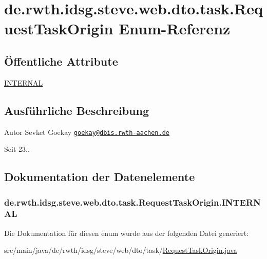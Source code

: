 \hypertarget{enumde_1_1rwth_1_1idsg_1_1steve_1_1web_1_1dto_1_1task_1_1_request_task_origin}{\section{de.\+rwth.\+idsg.\+steve.\+web.\+dto.\+task.\+Request\+Task\+Origin Enum-\/\+Referenz}
\label{enumde_1_1rwth_1_1idsg_1_1steve_1_1web_1_1dto_1_1task_1_1_request_task_origin}
}
\subsection*{Öffentliche Attribute}
\begin{DoxyCompactItemize}
\item 
\hyperlink{enumde_1_1rwth_1_1idsg_1_1steve_1_1web_1_1dto_1_1task_1_1_request_task_origin_a9d491dee4bc48d5484f074c4d2730bfe}{I\+N\+T\+E\+R\+N\+A\+L}
\end{DoxyCompactItemize}


\subsection{Ausführliche Beschreibung}
\begin{DoxyAuthor}{Autor}
Sevket Goekay \href{mailto:goekay@dbis.rwth-aachen.de}{\tt goekay@dbis.\+rwth-\/aachen.\+de} 
\end{DoxyAuthor}
\begin{DoxySince}{Seit}
23.. 
\end{DoxySince}


\subsection{Dokumentation der Datenelemente}
\hypertarget{enumde_1_1rwth_1_1idsg_1_1steve_1_1web_1_1dto_1_1task_1_1_request_task_origin_a9d491dee4bc48d5484f074c4d2730bfe}{
\subsubsection[{I\+N\+T\+E\+R\+N\+A\+L}]{\setlength{\rightskip}{0pt plus 5cm}de.\+rwth.\+idsg.\+steve.\+web.\+dto.\+task.\+Request\+Task\+Origin.\+I\+N\+T\+E\+R\+N\+A\+L}}\label{enumde_1_1rwth_1_1idsg_1_1steve_1_1web_1_1dto_1_1task_1_1_request_task_origin_a9d491dee4bc48d5484f074c4d2730bfe}


Die Dokumentation für diesen enum wurde aus der folgenden Datei generiert\+:\begin{DoxyCompactItemize}
\item 
src/main/java/de/rwth/idsg/steve/web/dto/task/\hyperlink{_request_task_origin_8java}{Request\+Task\+Origin.\+java}\end{DoxyCompactItemize}
